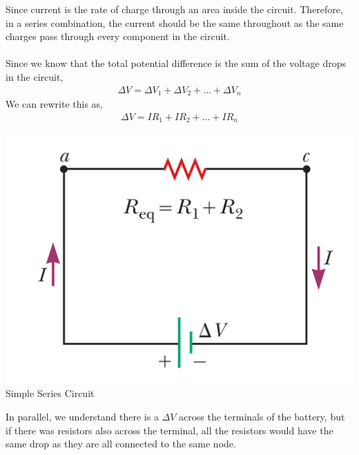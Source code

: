 \documentclass[12pt, titlepage, oneside]{article}
\begin{document}
Since current is the rate of charge through an area inside the circuit. Therefore, in a series combination, the current should be the same throughout as the same charges pass through every component in the circuit.\\

\noindent{}\\
	
	Since we know that the total potential difference is the sum of the voltage drops in the circuit,
	\begin{align*}
	\Delta V = \Delta V_1 + \Delta V_2 + ... + \Delta V_n
	\end{align*}
	We can rewrite this as,
	\begin{align*}
	\Delta V = IR_1 + IR_2 + ... + IR_n
	\end{align*}	
	\noindent{}
		\begin{center}
			\includegraphics[scale=0.4]{2.png} Simple Series Circuit
		\end{center}
	In parallel, we understand there is a $\Delta V$ across the terminals of the battery, but if there was resistors also across the terminal, all the resistors would have the same drop as they are all connected to the same node.\\
	
\end{document}
